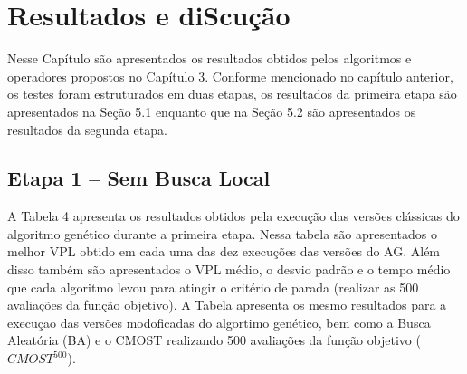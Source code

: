\chapter{Resultados e diScução}
\label{ch:ch5}
Nesse Capítulo são apresentados os resultados obtidos pelos algoritmos e operadores propostos no Capítulo 3. Conforme mencionado no capítulo anterior, os testes foram estruturados em duas etapas, os resultados da primeira etapa são apresentados na Seção 5.1 enquanto que na Seção 5.2 são apresentados os resultados da segunda etapa.

\section{Etapa 1 – Sem Busca Local}

A Tabela 4 apresenta os resultados obtidos pela execução das versões clássicas do algoritmo genético durante a primeira etapa. Nessa tabela são apresentados o melhor VPL obtido em cada uma das dez execuções das versões do AG. Além disso também são apresentados o VPL médio, o desvio padrão e o tempo médio que cada algoritmo levou para atingir o critério de parada (realizar as 500 avaliações da função objetivo). A Tabela apresenta os mesmo resultados para a execuçao das versões modoficadas do algortimo genético, bem como a Busca Aleatória (BA) e o CMOST realizando 500 avaliações da função objetivo ( $CMOST^500$).

